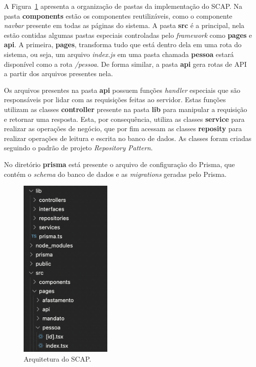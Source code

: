 A Figura~\ref{fig-pastas} apresenta a organização de pastas da implementação do SCAP. 
Na pasta \textbf{components} estão os componentes reutilizáveis, como o componente \textit{navbar} presente em todas as páginas do sistema.
A pasta \textbf{src} é a principal, nela estão contidas algumas pastas especiais controladas pelo \textit{framework}
como \textbf{pages} e \textbf{api}. A primeira, \textbf{pages}, transforma tudo que está dentro dela em uma rota do sistema,
ou seja, um arquivo \textit{index.js} em uma pasta chamada \textbf{pessoa} estará disponível como a rota \textit{/pessoa}.
De forma similar, a pasta \textbf{api} gera rotas de API a partir dos arquivos presentes nela.

Os arquivos presentes na pasta \textbf{api} possuem funções \textit{handler} especiais que são responsáveis por lidar com as requisições feitas ao servidor.
Estas funções utilizam as classes \textbf{controller} presente na pasta \textbf{lib} para manipular a requisição e retornar uma resposta.
Esta, por consequência, utiliza as classes \textbf{service} para realizar as operações de negócio, que por fim acessam as classes \textbf{reposity} para realizar
operações de leitura e escrita no banco de dados. As classes foram criadas seguindo o padrão de projeto \textit{Repository Pattern}.

No diretório \textbf{prisma} está presente o arquivo de configuração do Prisma, que contém o \textit{schema} do banco de dados e as \textit{migrations}
geradas pelo Prisma.

\begin{figure}
    \centering
    \includegraphics[width=0.4\textwidth]{figuras/fig-pastas.png}
    \caption{Arquitetura do SCAP.}
    \label{fig-pastas}
\end{figure}


